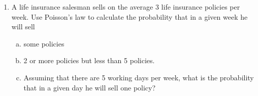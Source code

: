 \documentclass[a4paper,12pt]{article}
\begin{document}
\begin{enumerate}
\begin{itemize}
\end{itemize}


\item
A life insurance salesman sells on the average 3 life insurance policies per week. Use Poisson's law to calculate the probability that in a given week he will sell

\begin{enumerate}[(a)]
\item some policies
\item 2 or more policies but less than 5 policies.
\item Assuming that there are 5 working days per week, what is the probability that in a given day he will sell one policy?
\end{enumerate}



\end{enumerate}
\end{document}
